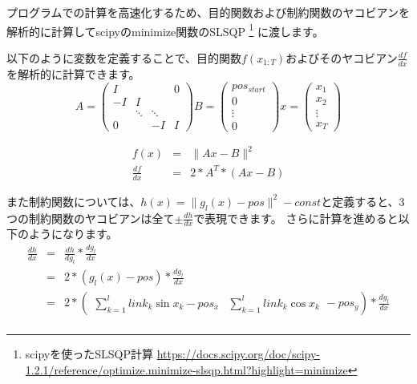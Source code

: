 プログラムでの計算を高速化するため、目的関数および制約関数のヤコビアンを解析的に計算してscipyのminimize関数のSLSQP
\footnote{scipyを使ったSLSQP計算 \url{https://docs.scipy.org/doc/scipy-1.2.1/reference/optimize.minimize-slsqp.html?highlight=minimize}}
に渡します。

以下のように変数を定義することで、目的関数$f(x_{1:T})$およびそのヤコビアン$\displaystyle \frac{df}{dx}$を解析的に計算できます。
\begin{equation*}
  A =
  \begin{pmatrix}
    I      &        &        & 0      \\
    -I     & I      &        &        \\
           & \ddots & \ddots &        \\
    0      &        & -I     & I
  \end{pmatrix}
  B =
  \begin{pmatrix}
    pos_{start} \\
    0           \\
    \vdots      \\
    0
  \end{pmatrix}
  x =
  \begin{pmatrix}
    x_1    \\
    x_2    \\
    \vdots \\
    x_T
  \end{pmatrix}
\end{equation*}

\begin{eqnarray*}
  f(x) &=& \|Ax - B\|^2 \\
  \frac{df}{dx} &=& 2 * A^T *(Ax - B)
\end{eqnarray*}

\clearpage
また制約関数については、$h(x) = \|g_{l}(x) - pos\|^2 - const$と定義すると、3つの制約関数のヤコビアンは全て$\displaystyle \pm \frac{dh}{dx}$で表現できます。
さらに計算を進めると以下のようになります。
\begin{eqnarray*}
  \frac{dh}{dx} &=& \frac{dh}{dg_{l}} * \frac{dg_{l}}{dx} \\
                &=& 2 * (g_{l}(x) - pos) * \frac{dg_{l}}{dx} \\
                &=& 2 * \left( \begin{array}{cc} \sum_{k=1}^{l} link_k\sin{x_k} - pos_x & \sum_{k=1}^{l} link_k\cos{x_k} \end{array} - pos_y \right) * \frac{dg_{l}}{dx} \\
\end{eqnarray*}

